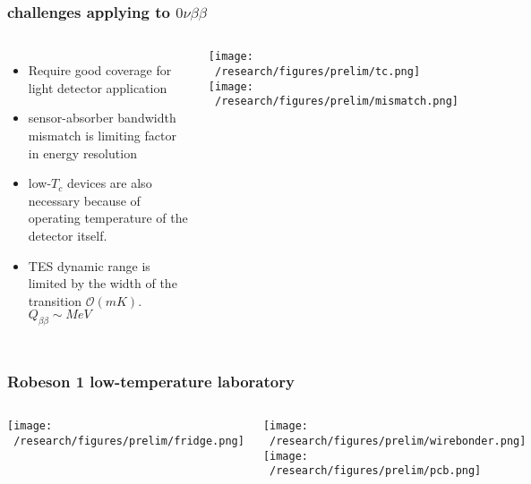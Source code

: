 \documentclass{beamer}
\begin{document}
	\begin{frame}
		\frametitle{challenges applying to $0\nu\beta\beta$}
		\begin{columns}[c] %
			
			\begin{itemize}
				\setlength\itemsep{2em}
				\item Require good coverage for light detector application
				\item sensor-absorber bandwidth mismatch is limiting factor in energy resolution
				\item low-$T_c$ devices are also necessary because of operating temperature of the detector itself.
				\item TES dynamic range is limited by the width of the transition $\mathcal{O}(mK)$. $Q_{\beta\beta} \sim MeV$
			\end{itemize}
			
			\texttt{[image: ~/research/figures/prelim/tc.png]}
			\texttt{[image: ~/research/figures/prelim/mismatch.png]}
			
		\end{columns}
	\end{frame}	
	
	\begin{frame}
		\frametitle{Robeson 1 low-temperature laboratory}
		\begin{columns}[c] %
			
			\texttt{[image: ~/research/figures/prelim/fridge.png]}
			
			
			\texttt{[image: ~/research/figures/prelim/wirebonder.png]}
			\texttt{[image: ~/research/figures/prelim/pcb.png]}
			
		\end{columns}
	\end{frame}	
	
	
	
\end{document}
